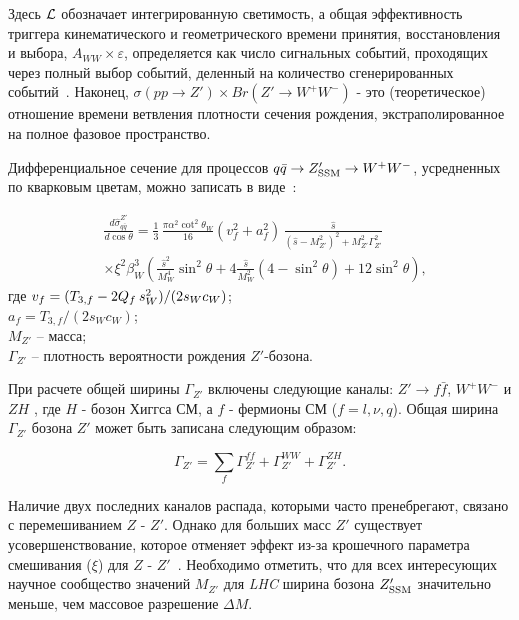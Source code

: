 Здесь $ {\cal L} $ обозначает интегрированную светимость, а общая эффективность триггера кинематического и геометрического времени принятия, восстановления и выбора, $ A_ {WW} \times \varepsilon $, определяется как число сигнальных событий, проходящих через полный выбор событий, деленный на количество сгенерированных событий~\cite{2part-pankov}. Наконец, $ \sigma (pp \to Z ') \times {Br} (Z' \to W ^ + W ^ -) $ - это (теоретическое) отношение времени ветвления плотности сечения рождения, экстраполированное на полное фазовое пространство.

Дифференциальное сечение для процессов $ q \bar {q} \to Z '_ {\rm SSM} \to W ^ + W ^ - $, усредненных по кварковым цветам, можно записать в виде~\cite{2part-pankov}:

\begin{align}
&\frac{d\hat{\sigma}^{Z'}_{q \bar q}}{d \cos\theta}
= \frac{1}{3}\,\frac{\pi\alpha^2 \cot^2\theta_W}{16 }
\left(v_{f}^2 + a_{f}^2\right)\, \frac{\hat{s}}
{\left(\hat{s} - M_{Z'}^2\right)^2 + M_{Z'}^2\Gamma_{Z'}^2}  \nonumber \\
& \times  \xi^2\beta_W^3 \left(\frac{\hat{s}^2}{M_W^4}
\sin^2\theta +
4\frac{\hat{s}}{M_W^2}(4-\sin^2\theta)+12\sin^2\theta\right),
\label{xsection2}
\end{align}
где $v_f=(T_{3,f}-2Q_f\hskip 2pt s_W^2)/(2s_Wc_W)$;\\
$a_f=T_{3,f}/(2s_Wc_W)$;\\
$M_{Z'}$ -- масса;\\
$\Gamma_{Z'}$ -- плотность вероятности рождения $Z'$-бозона.

При расчете общей ширины $ \Gamma_ {Z '} $ включены следующие каналы: $ Z' \to f \bar f $, $ W ^ + W ^ - $ и $ ZH $ \cite{2part-pankov}, где $ H $ - бозон Хиггса СМ, а $ f $ - фермионы СМ ($ f = l, \nu, q $). Общая ширина $ \Gamma_ {Z '} $ бозона $ Z' $ может быть записана следующим образом:

\begin{equation}\label{gamma2}
\Gamma_{Z'} = \sum_f \Gamma_{Z'}^{ff} + \Gamma_{Z'}^{WW} +
\Gamma_{Z'}^{ZH}.
\end{equation}

Наличие двух последних каналов распада, которыми часто пренебрегают, связано с перемешиванием $ Z $ - $ Z '$. Однако для больших масс $ Z '$ существует усовершенствование, которое отменяет эффект из-за крошечного параметра смешивания ($ \xi $) для $ Z $ - $ Z' $~\cite{2part-pankov}. Необходимо отметить, что для всех интересующих научное сообщество значений $ M_ {Z '} $ для \textit{LHC} ширина бозона $ Z' _ {\rm SSM} $ значительно меньше, чем массовое разрешение $ \Delta M $.

